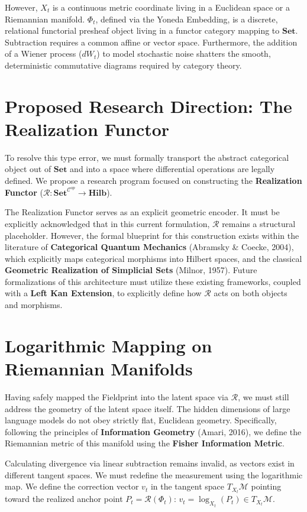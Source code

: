 \documentclass{article}
\begin{document}
However, $X_t$ is a continuous metric coordinate living in a Euclidean space or a Riemannian manifold. $\Phi_t$, defined via the Yoneda Embedding, is a discrete, relational functorial presheaf object living in a functor category mapping to $\mathbf{Set}$. Subtraction requires a common affine or vector space. Furthermore, the addition of a Wiener process ($dW_t$) to model stochastic noise shatters the smooth, deterministic commutative diagrams required by category theory. 

\section{Proposed Research Direction: The Realization Functor}
To resolve this type error, we must formally transport the abstract categorical object out of $\mathbf{Set}$ and into a space where differential operations are legally defined. We propose a research program focused on constructing the \textbf{Realization Functor} ($\mathcal{R}: \mathbf{Set}^{\mathcal{C}^{op}} \to \mathbf{Hilb}$).

The Realization Functor serves as an explicit geometric encoder. It must be explicitly acknowledged that in this current formulation, $\mathcal{R}$ remains a structural placeholder. However, the formal blueprint for this construction exists within the literature of \textbf{Categorical Quantum Mechanics} (Abramsky \& Coecke, 2004), which explicitly maps categorical morphisms into Hilbert spaces, and the classical \textbf{Geometric Realization of Simplicial Sets} (Milnor, 1957). Future formalizations of this architecture must utilize these existing frameworks, coupled with a \textbf{Left Kan Extension}, to explicitly define how $\mathcal{R}$ acts on both objects and morphisms.

\section{Logarithmic Mapping on Riemannian Manifolds}
Having safely mapped the Fieldprint into the latent space via $\mathcal{R}$, we must still address the geometry of the latent space itself. The hidden dimensions of large language models do not obey strictly flat, Euclidean geometry. Specifically, following the principles of \textbf{Information Geometry} (Amari, 2016), we define the Riemannian metric of this manifold using the \textbf{Fisher Information Metric}.

Calculating divergence via linear subtraction remains invalid, as vectors exist in different tangent spaces. We must redefine the measurement using the logarithmic map. We define the correction vector $v_t$ in the tangent space $T_{X_t}\mathcal{M}$ pointing toward the realized anchor point $P_t = \mathcal{R}(\Phi_t)$: $v_t = \log_{X_t}(P_t) \in T_{X_t}\mathcal{M}$.
\end{document}
